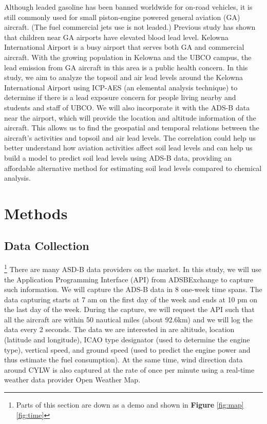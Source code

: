 \documentclass[12pt]{article}
\begin{document}
Although leaded gasoline has been banned worldwide for on-road vehicles, it is still commonly used for small piston-engine powered general aviation (GA) aircraft. (The fuel commercial jets use is not leaded.) Previous study has shown that children near GA airports have elevated blood lead level.\supercite{miranda_geospatial_2011} \supercite{zahran_leaded_2023} \supercite{mills_lead_2022} \supercite{zahran_effect_2017} Kelowna International Airport is a busy airport that serves both GA and commercial aircraft. With the growing population in Kelowna and the UBCO campus, the lead emission from GA aircraft in this area is a public health concern. In this study, we aim to analyze the topsoil and air lead levels around the Kelowna International Airport using ICP-AES (an elemental analysis technique) to determine if there is a lead exposure concern for people living nearby and students and staff of UBCO. We will also incorporate it with the ADS-B data near the airport, which will provide the location and altitude information of the aircraft. This allows us to find the geospatial and temporal relations between the aircraft's activities and topsoil and air lead levels. The correlation could help us better understand how aviation activities affect soil lead levels and can help us build a model to predict soil lead levels using ADS-B data, providing an affordable alternative method for estimating soil lead levels compared to chemical analysis.
\section{Methods}
\subsection{Data Collection} \footnote{Parts of this section are down as a demo and shown in \textbf{Figure} \ref{fig:map} \ref{fig:time}}
There are many ASD-B data providers on the market. In this study, we will use the Application Programming Interface (API) from ADSBExchange \supercite{adsbexchange} to capture such information. We will capture the ADS-B data in 8 one-week time spans. The data capturing starts at 7 am on the first day of the week and ends at 10 pm on the last day of the week. During the capture, we will request the API such that all the aircraft are within 50 nautical miles (about 92.6km) and we will log the data every 2 seconds. The data we are interested in are altitude, location (latitude and longitude), ICAO type designator (used to determine the engine type), vertical speed, and ground speed (used to predict the engine power and thus estimate the fuel consumption). At the same time, wind direction data around CYLW is also captured at the rate of once per minute using a real-time weather data provider Open Weather Map. 
\end{document}
